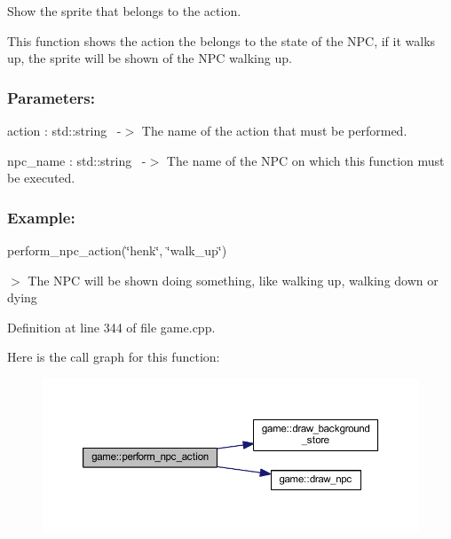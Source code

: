 Show the sprite that belongs to the action. 

This function shows the action the belongs to the state of the N\+PC, if it walks up, the sprite will be shown of the N\+PC walking up.~\newline


\subsubsection*{Parameters\+: }

action \+: std\+::string~\newline
-\/$>$ The name of the action that must be performed.

npc\+\_\+name \+: std\+::string~\newline
-\/$>$ The name of the N\+PC on which this function must be executed.

\subsubsection*{Example\+: }

perform\+\_\+npc\+\_\+action(\char`\"{}henk\char`\"{}, \char`\"{}walk\+\_\+up\char`\"{}) ~\newline

\begin{DoxyItemize}
\item $>$ The N\+PC will be shown doing something, like walking up, walking down or dying 
\end{DoxyItemize}

Definition at line 344 of file game.\+cpp.

Here is the call graph for this function\+:
\nopagebreak
\begin{figure}[H]
\begin{center}
\leavevmode
\includegraphics[width=350pt]{classgame_a5b71f711786b1b48343dd02d31551a69_cgraph}
\end{center}
\end{figure}
\mbox{\label{classgame_a50870549f1abdbc924743d8173ced15d}} 
